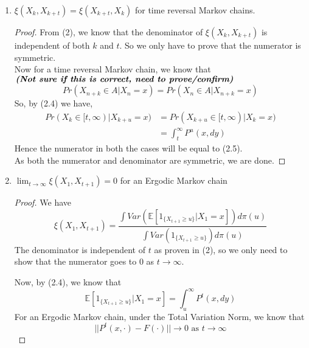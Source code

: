 \begin{theorem}
\begin{enumerate}
        \item $\xi(X_k, X_{k+t}) = \xi(X_{k+t}, X_k)$ for time reversal Markov chains. 
        \begin{proof}
            From (2), we know that the denominator of $\xi(X_k, X_{k+t})$ is independent of both $k$ and $t$. So we only have to prove that the numerator is symmetric. \\
            Now for a time reversal Markov chain, we know that \\
            $\textit{\textbf{(Not sure if this is correct, need to prove/confirm)}}$
            $$Pr(X_{n+k} \in A | X_n = x) = Pr(X_n \in A | X_{n+k} = x)$$
            So, by (2.4) we have,
            \begin{align*}
                Pr(X_k \in [t, \infty) | X_{k+u} = x) &= Pr(X_{k+u} \in [t, \infty) | X_k = x) \\
                &= \int_t^{\infty} P^u(x, dy)
            \end{align*}
            Hence the numerator in both the cases will be equal to (2.5). \\
            As both the numerator and denominator are symmetric, we are done.
        \end{proof}
        
        \item $\lim_{t \rightarrow \infty} \xi(X_1, X_{t+1}) = 0$ for an Ergodic Markov chain
        \begin{proof}
            We have
            \begin{equation*}
                \xi(X_1, X_{t+1}) = \frac{\int Var(\mathbb{E}[1_{\{X_{t+1} \geq u\}}|X_1=x]) d\pi(u)}{\int Var(1_{\{X_{t+1} \geq u\}}) d\pi(u)}
            \end{equation*}
            The denominator is independent of $t$ as proven in (2), so we only need to show that the numerator goes to 0 as $t \rightarrow \infty$.\\
            \begin{lemma}
                
            \end{lemma}
            Now, by (2.4), we know that
            \begin{equation*}
                \mathbb{E}[1_{\{X_{t+1} \geq u\}}|X_1=x] = \int_u^{\infty} P^{t}(x, dy)
            \end{equation*}
            For an Ergodic Markov chain, under the Total Variation Norm, we know that 
            \begin{equation*}
                ||P^t(x, \cdot) - F(\cdot)|| \rightarrow 0 \text{ as } t \rightarrow \infty
            \end{equation*}
        \end{proof}
    \end{enumerate}
\end{theorem}